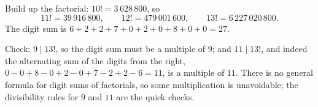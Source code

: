 Build up the factorial: $10!=3\,628\,800$, so
\[
11!=39\,916\,800,\qquad 12!=479\,001\,600,\qquad 13!=6\,227\,020\,800 .
\]
The digit sum is $6+2+2+7+0+2+0+8+0+0=\boxed{27}$.

Check: $9\mid13!$, so the digit sum must be a multiple of $9$; and $11\mid13!$, and indeed the alternating sum of the digits from the right, $0-0+8-0+2-0+7-2+2-6=11$, is a multiple of $11$. There is no general formula for digit sums of factorials, so some multiplication is unavoidable; the divisibility rules for $9$ and $11$ are the quick checks.
